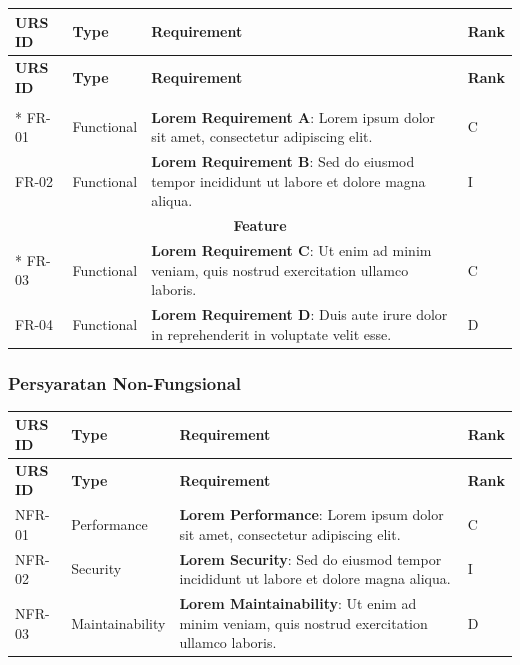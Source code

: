 \documentclass[12pt,a4paper]{article}
\begin{document}
\begin{longtable}{|p{2.5cm}|p{2.5cm}|p{7cm}|p{1.5cm}|}
\hline
\textbf{URS ID} & \textbf{Type} & \textbf{Requirement} & \textbf{Rank} \\
\hline
\endfirsthead
\hline
\textbf{URS ID} & \textbf{Type} & \textbf{Requirement} & \textbf{Rank} \\
\hline
\endhead
\hline
\endfoot

\multicolumn{4}{|c|}{\cellcolor{gray!25}\textbf{General}} \\*
\hline
FR-01 & Functional & \textbf{Lorem Requirement A}: Lorem ipsum dolor sit amet, consectetur adipiscing elit. & C \\
\hline
FR-02 & Functional & \textbf{Lorem Requirement B}: Sed do eiusmod tempor incididunt ut labore et dolore magna aliqua. & I \\
\hline

\multicolumn{4}{|c|}{\cellcolor{gray!25}\textbf{Feature}} \\*
\hline
FR-03 & Functional & \textbf{Lorem Requirement C}: Ut enim ad minim veniam, quis nostrud exercitation ullamco laboris. & C \\
\hline
FR-04 & Functional & \textbf{Lorem Requirement D}: Duis aute irure dolor in reprehenderit in voluptate velit esse. & D \\
\hline

\end{longtable}


\subsubsection{Persyaratan Non-Fungsional}

\begin{longtable}{|p{2.5cm}|p{2.5cm}|p{7cm}|p{1.5cm}|}
\hline
\textbf{URS ID} & \textbf{Type} & \textbf{Requirement} & \textbf{Rank} \\
\hline
\endfirsthead
\hline
\textbf{URS ID} & \textbf{Type} & \textbf{Requirement} & \textbf{Rank} \\
\hline
\endhead
\hline
\endfoot

NFR-01 & Performance & \textbf{Lorem Performance}: Lorem ipsum dolor sit amet, consectetur adipiscing elit. & C \\
\hline

NFR-02 & Security & \textbf{Lorem Security}: Sed do eiusmod tempor incididunt ut labore et dolore magna aliqua. & I \\
\hline

NFR-03 & Maintainability & \textbf{Lorem Maintainability}: Ut enim ad minim veniam, quis nostrud exercitation ullamco laboris. & D \\
\hline

\end{longtable}
\end{document}
